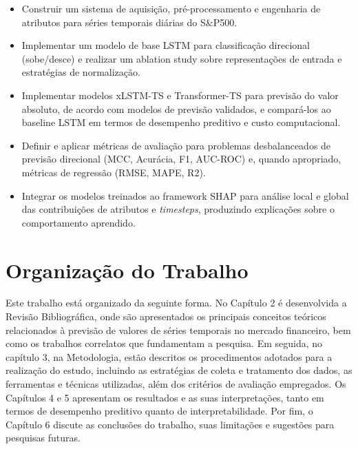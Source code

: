 \begin{itemize}
    \item Construir um sistema de aquisição, pré-processamento e engenharia de atributos para séries temporais diárias do S\&P500.
    \item Implementar um modelo de base LSTM para classificação direcional (sobe/desce) e realizar um ablation study sobre representações de entrada e estratégias de normalização.
    \item Implementar modelos xLSTM-TS e Transformer-TS para previsão do valor absoluto, de acordo com modelos de previsão validados, e compará-los ao baseline LSTM em termos de desempenho preditivo e custo computacional.
    \item Definir e aplicar métricas de avaliação para problemas desbalanceados de previsão direcional (MCC, Acurácia, F1, AUC-ROC) e, quando apropriado, métricas de regressão (RMSE, MAPE, R2).
    \item Integrar os modelos treinados ao framework SHAP para análise local e global das contribuições de atributos e \textit{timesteps}, produzindo explicações sobre o comportamento aprendido.
\end{itemize}

\section{Organização do Trabalho}

Este trabalho está organizado da seguinte forma. No Capítulo 2 é desenvolvida a Revisão Bibliográfica, onde são apresentados os principais conceitos teóricos relacionados à previsão de valores de séries temporais no mercado financeiro, bem como os trabalhos correlatos que fundamentam a pesquisa. Em seguida, no capítulo 3, na Metodologia, estão descritos os procedimentos adotados para a realização do estudo, incluindo as estratégias de coleta e tratamento dos dados, as ferramentas e técnicas utilizadas, além dos critérios de avaliação empregados. Os Capítulos 4 e 5 apresentam os resultados e as suas interpretações, tanto em termos de desempenho preditivo quanto de interpretabilidade. Por fim, o Capítulo 6 discute as conclusões do trabalho, suas limitações e sugestões para pesquisas futuras.
